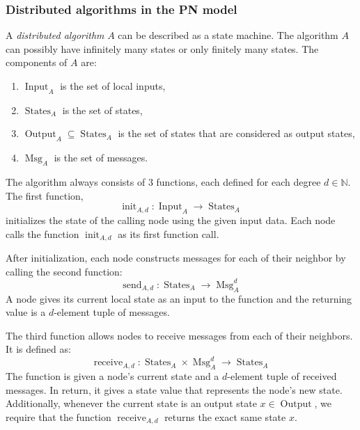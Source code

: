 \subsubsection{Distributed algorithms in the PN model}

\newcommand{\algin}{\operatorname{Input}}
\newcommand{\algstates}{\operatorname{States}}
\newcommand{\algout}{\operatorname{Output}}
\newcommand{\algmsg}{\operatorname{Msg}}

\newcommand{\alginit}{\operatorname{init}}
\newcommand{\algsend}{\operatorname{send}}
\newcommand{\algrecv}{\operatorname{receive}}

A \emph{distributed algorithm} $A$ can be described as a state machine.
The algorithm $A$ can possibly have infinitely many states or only finitely many states.
The components of $A$ are:
\begin{enumerate}
  \item $\algin_A$ is the set of local inputs,
  \item $\algstates_A$ is the set of states,
  \item $\algout_A \subseteq \algstates_A$ is the set of states that are considered as output states,
  \item $\algmsg_A$ is the set of messages.
\end{enumerate}

The algorithm always consists of 3 functions, each defined for each degree $d \in \mathbb{N}$.
The first function, $$\alginit_{A,d}\colon \algin_A \rightarrow \algstates_A$$ initializes the state of the calling node using the given input data.
Each node calls the function $\alginit_{A,d}$ as its first function call.

After initialization, each node constructs messages for each of their neighbor by calling the second function:
$$\algsend_{A,d}\colon \algstates_A \rightarrow \algmsg_A^d$$
A node gives its current local state as an input to the function and the returning value is a $d$-element tuple of messages.

The third function allows nodes to receive messages from each of their neighbors.
It is defined as:
$$\algrecv_{A,d}\colon \algstates_A \times \algmsg_A^d \rightarrow \algstates_A$$
The function is given a node's current state and a $d$-element tuple of received messages.
In return, it gives a state value that represents the node's new state.
Additionally, whenever the current state is an output state $x \in \algout$, we require that the function $\algrecv_{A,d}$ returns the exact same state $x$.

